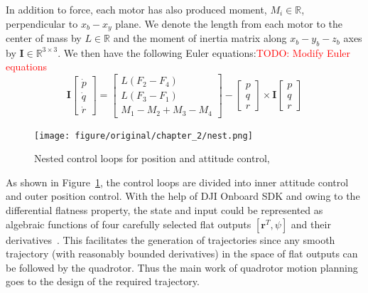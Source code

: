 In addition to force, each motor has also produced moment, $\mathit{M_i}\in\mathbb{R}$, perpendicular to $x_b-x_y$ plane. We denote the length from each motor to the center of mass by $\mathit{L}\in\mathbb{R}$ and the moment of inertia matrix along $x_b-y_b-z_b$ axes by $\mathbf{I}\in\mathbb{R}^{3\times3}$. We then have the following Euler equations:\textcolor{red}{TODO: Modify Euler equations}
\begin{equation}\label{eq:euler}
\mathbf{I}\begin{bmatrix}\dot{p}\\\dot{q}\\\dot{r}\end{bmatrix}=\begin{bmatrix}L(F_2-F_4)\\L(F_3-F_1)\\M_1-M_2+M_3-M_4\end{bmatrix}-\begin{bmatrix}p\\q\\r\end{bmatrix}\times
\mathbf{I}\begin{bmatrix}p\\q\\r\end{bmatrix}
\end{equation}

\begin{figure}[htb]
  \centering
  \texttt{[image: figure/original/chapter\_2/nest.png]}
  \caption{Nested control loops for position and attitude control,~\cite{GRASP}}
  \label{fig:nest}
\end{figure}

As shown in Figure~\ref{fig:nest}, the control loops are divided into inner attitude control and outer position control. With the help of DJI Onboard SDK and owing to the differential flatness property, the state and input could be represented as algebraic functions of four carefully selected flat outputs $[\mathbf{r}^T, \psi]$ and their derivatives~\cite{Snap}. This facilitates the generation of trajectories since any smooth trajectory (with reasonably bounded derivatives) in the space of flat outputs can be followed by the quadrotor. Thus the main work of quadrotor motion planning goes to the design of the required trajectory.


\newpage